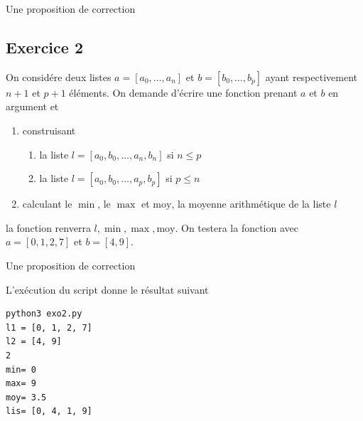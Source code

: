 \documentclass[a4paper,12pt]{article}
\begin{document}
Une proposition de correction


\clearpage
\subsection{Exercice 2}
\begin{leftbar}
On consid\'ere deux listes $a=[a_0,\ldots,a_n]$ et $b=[b_0,\ldots,b_p]$ ayant respectivement $n+1$ et $p+1$ \'el\'ements. On demande d'\'ecrire une  fonction prenant $a$ et $b$ en argument et 
\begin{enumerate}
\item construisant 
\begin{enumerate}
\item la liste $l=[a_0,b_0,\ldots,a_n,b_n]$ si $n\leq p$
\item la liste $l=[a_0,b_0,\ldots,a_p,b_p]$ si $p\leq n$
\end{enumerate}
\item calculant le $\min$, le $\max$ et $\mathrm{moy}$, la moyenne arithm\'etique de la liste $l$
\end{enumerate}
la fonction renverra $l,\min,\max,\mathrm{moy}$. On testera la fonction avec $a=[0,1,2,7]$ et $b=[4,9]$.
\end{leftbar}

Une proposition de correction


L'ex\'ecution du script donne le r\'esultat suivant
\begin{verbatim}
python3 exo2.py 
l1 = [0, 1, 2, 7]
l2 = [4, 9]
2
min= 0
max= 9
moy= 3.5
lis= [0, 4, 1, 9]
\end{verbatim}

\clearpage
\end{document}
